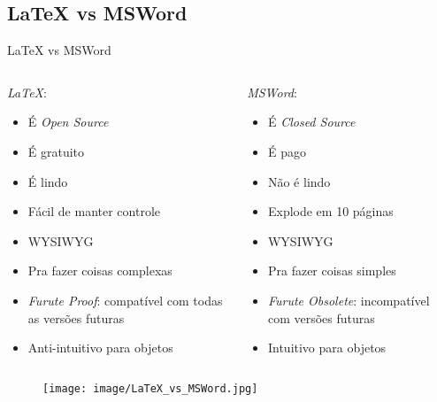     \subsection{\LaTeX{} vs MSWord}
	\begin{frame}{\LaTeX{} vs MSWord}
		\begin{columns}
		    \begin{column}{0.5\linewidth}
		        \emph{\LaTeX{}}:
        		\begin{itemize}[<+->]
                    \item É \textit{Open Source}
                    \item É gratuito
                    \item É lindo
                    \item Fácil de manter controle
                    \item WYSI\textbf{}WYG
                    \item Pra fazer coisas complexas
                    \item \textit{Furute Proof}: compatível com todas as versões futuras
        		    \item Anti-intuitivo para objetos
                \end{itemize}
            \end{column}
            \begin{column}{0.5\linewidth}
                \emph{MSWord}:
                \begin{itemize}[<+(-8)->]
                    \item É \textit{Closed Source}
                    \item É pago
                    \item Não é lindo
                    \item Explode em 10 páginas
                    \item WYSIWYG
                    \item Pra fazer coisas simples
                    \item \textit{Furute Obsolete}: incompatível com versões futuras
        		    \item Intuitivo para objetos
                \end{itemize}
            \end{column}
        \end{columns}
	\end{frame}

	\begin{frame}
    	\begin{figure}[!h]
		    \centering
			\texttt{[image: image/LaTeX\_vs\_MSWord.jpg]}
    	\end{figure}
	\end{frame}

